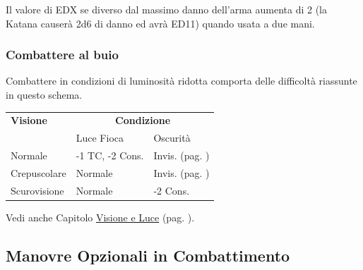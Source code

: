 \begin{multicols}{2}
Il valore di EDX se diverso dal massimo danno dell'arma aumenta di 2 (la Katana causerà 2d6 di danno ed avrà ED11) quando usata a due mani.

\subsubsection{Combattere al buio}

Combattere in condizioni di luminosità ridotta comporta delle difficoltà riassunte in questo schema.

\medskip

\noindent\begin{tabular}{lll}
\textbf{Visione} & \multicolumn{2}{c}{\textbf{Condizione}}\\
& Luce Fioca & Oscurità\\
\toprule
Normale & -1 TC, -2 Cons. & Invis. (pag. \pageref{invisibilita})\\
Crepuscolare & Normale & Invis. (pag. \pageref{invisibilita})\\
Scurovisione & Normale & -2 Cons.
\end{tabular}

\medskip

Vedi anche Capitolo \hyperlink{visioneeluce}{Visione e Luce} (pag. \pageref{visioneeluce}).


\subsection{Manovre Opzionali in Combattimento}\label{azioniopzionaliincombattimento}


\end{multicols}
